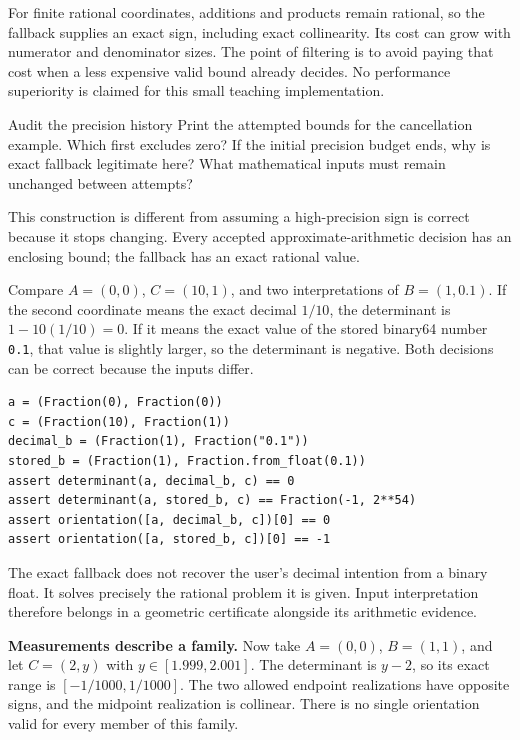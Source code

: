 For finite rational coordinates, additions and products remain rational, so
the fallback supplies an exact sign, including exact collinearity. Its cost
can grow with numerator and denominator sizes. The point of filtering is
to avoid paying that cost when a less expensive valid bound already decides.
No performance superiority is claimed for this small teaching implementation.

\begin{question}{Audit the precision history}
Print the attempted bounds for the cancellation example. Which first
excludes zero? If the initial precision budget ends, why is exact fallback
legitimate here? What mathematical inputs must remain unchanged between attempts?
\end{question}

This construction is different from assuming a high-precision sign is
correct because it stops changing. Every accepted approximate-arithmetic
decision has an enclosing bound; the fallback has an exact rational value.

\newpage
{}
Compare $A=(0,0)$, $C=(10,1)$, and two interpretations of $B=(1,0.1)$.
If the second coordinate means the exact decimal $1/10$, the determinant
is $1-10(1/10)=0$. If it means the exact value of the stored binary64
number \texttt{0.1}, that value is slightly larger, so the determinant
is negative. Both decisions can be correct because the inputs differ.
\begin{lstlisting}
a = (Fraction(0), Fraction(0))
c = (Fraction(10), Fraction(1))
decimal_b = (Fraction(1), Fraction("0.1"))
stored_b = (Fraction(1), Fraction.from_float(0.1))
assert determinant(a, decimal_b, c) == 0
assert determinant(a, stored_b, c) == Fraction(-1, 2**54)
assert orientation([a, decimal_b, c])[0] == 0
assert orientation([a, stored_b, c])[0] == -1
\end{lstlisting}

The exact fallback does not recover the user's decimal intention from a
binary float. It solves precisely the rational problem it is given. Input
interpretation therefore belongs in a geometric certificate alongside its
arithmetic evidence.

\textbf{Measurements describe a family.} Now take $A=(0,0)$, $B=(1,1)$,
and let $C=(2,y)$ with $y\in[1.999,2.001]$. The determinant is $y-2$,
so its exact range is $[-1/1000,1/1000]$. The two allowed endpoint
realizations have opposite signs, and the midpoint realization is collinear.
There is no single orientation valid for every member of this family.

